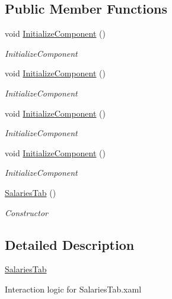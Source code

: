 \subsection*{Public Member Functions}
\begin{DoxyCompactItemize}
\item 
void \hyperlink{class_baudi_1_1_client_1_1_view_1_1_tabs_1_1_salaries_tab_af2345e3d7cb08794018cf9742bf98b9a}{Initialize\+Component} ()
\begin{DoxyCompactList}\small\item\em Initialize\+Component \end{DoxyCompactList}\item 
void \hyperlink{class_baudi_1_1_client_1_1_view_1_1_tabs_1_1_salaries_tab_af2345e3d7cb08794018cf9742bf98b9a}{Initialize\+Component} ()
\begin{DoxyCompactList}\small\item\em Initialize\+Component \end{DoxyCompactList}\item 
void \hyperlink{class_baudi_1_1_client_1_1_view_1_1_tabs_1_1_salaries_tab_af2345e3d7cb08794018cf9742bf98b9a}{Initialize\+Component} ()
\begin{DoxyCompactList}\small\item\em Initialize\+Component \end{DoxyCompactList}\item 
void \hyperlink{class_baudi_1_1_client_1_1_view_1_1_tabs_1_1_salaries_tab_af2345e3d7cb08794018cf9742bf98b9a}{Initialize\+Component} ()
\begin{DoxyCompactList}\small\item\em Initialize\+Component \end{DoxyCompactList}\item 
\hyperlink{class_baudi_1_1_client_1_1_view_1_1_tabs_1_1_salaries_tab_acabebf3f2978c8f113ad34a3de86b1f4}{Salaries\+Tab} ()
\begin{DoxyCompactList}\small\item\em Constructor \end{DoxyCompactList}\end{DoxyCompactItemize}


\subsection{Detailed Description}
\hyperlink{class_baudi_1_1_client_1_1_view_1_1_tabs_1_1_salaries_tab}{Salaries\+Tab} 

Interaction logic for Salaries\+Tab.\+xaml 

